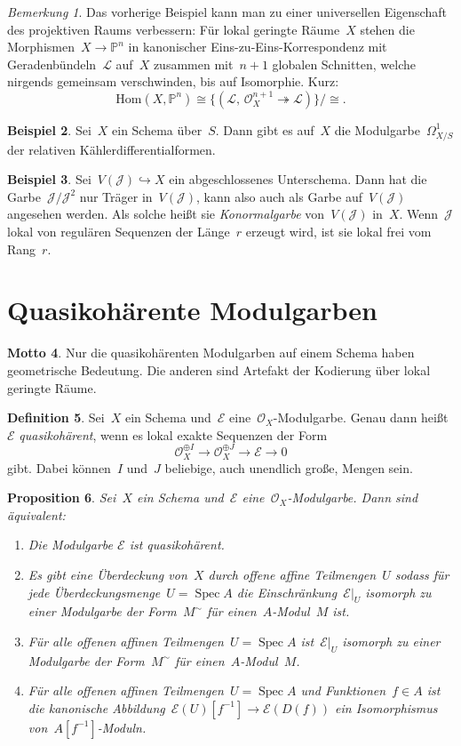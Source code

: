 \documentclass[a4paper,ngerman,12pt]{scrartcl}
\theoremstyle{definition}
\newtheorem{defn}{Definition}[section]
\newtheorem{ex}[defn]{Beispiel}
\newtheorem{motto}[defn]{Motto}
\theoremstyle{plain}
\newtheorem{prop}[defn]{Proposition}
\theoremstyle{remark}
\newtheorem{rem}[defn]{Bemerkung}
\newcommand{\PP}{\mathbb{P}}
\newcommand{\E}{\mathcal{E}}
\newcommand{\J}{\mathcal{J}}
\renewcommand{\L}{\mathcal{L}}
\renewcommand{\O}{\mathcal{O}}
\newcommand{\Hom}{\mathrm{Hom}}
\newcommand{\lra}{\longrightarrow}
\DeclareMathOperator{\Spec}{Spec}
\begin{document}
\begin{rem}Das vorherige Beispiel kann man zu einer universellen Eigenschaft
des projektiven Raums verbessern: Für lokal geringte Räume~$X$ stehen die
Morphismen~$X \to \PP^n$ in kanonischer Eins-zu-Eins-Korrespondenz mit
Geradenbündeln~$\L$ auf~$X$ zusammen mit~$n + 1$ globalen Schnitten, welche
nirgends gemeinsam verschwinden, bis auf Isomorphie. Kurz:
\[ \Hom(X, \PP^n) \cong \{ (\L,\,\O_X^{n+1} \twoheadrightarrow \L) \}/{\cong}. \]
\end{rem}

\begin{ex}Sei~$X$ ein Schema über~$S$. Dann gibt es auf~$X$ die
Modulgarbe~$\Omega^1_{X/S}$ der relativen Kählerdifferentialformen.\end{ex}

\begin{ex}Sei~$V(\J) \hookrightarrow X$ ein abgeschlossenes Unterschema. Dann
hat die Garbe~$\J/\J^2$ nur Träger in~$V(\J)$, kann also auch als Garbe
auf~$V(\J)$ angesehen werden. Als solche heißt sie \emph{Konormalgarbe}
von~$V(\J)$ in~$X$. Wenn~$\J$ lokal von regulären Sequenzen der Länge~$r$
erzeugt wird, ist sie lokal frei vom Rang~$r$.\end{ex}


\section{Quasikohärente Modulgarben}

\begin{motto}Nur die quasikohärenten Modulgarben auf einem Schema haben
geometrische Bedeutung. Die anderen sind Artefakt der Kodierung über lokal
geringte Räume.\end{motto}

\begin{defn}Sei~$X$ ein Schema und~$\E$ eine~$\O_X$-Modulgarbe. Genau dann
heißt~$\E$ \emph{quasikohärent}, wenn es lokal exakte Sequenzen der Form
\[ \O_X^{\oplus I} \lra \O_X^{\oplus J} \lra \E \lra 0 \]
gibt. Dabei können~$I$ und~$J$ beliebige, auch unendlich große, Mengen sein.
\end{defn}

\begin{prop}Sei~$X$ ein Schema und~$\E$ eine~$\O_X$-Modulgarbe. Dann sind
äquivalent:
\begin{enumerate}
\item Die Modulgarbe $\E$ ist quasikohärent.
\item Es gibt eine Überdeckung von~$X$ durch offene affine Teilmengen~$U$ sodass
für jede Überdeckungsmenge~$U = \Spec A$ die Einschränkung~$\E|_U$ isomorph zu
einer Modulgarbe der Form~$M^\sim$ für einen~$A$-Modul~$M$ ist.
\item Für alle offenen affinen Teilmengen~$U = \Spec A$ ist~$\E|_U$ isomorph zu einer
Modulgarbe der Form~$M^\sim$ für einen~$A$-Modul~$M$.
\item Für alle offenen affinen Teilmengen~$U = \Spec A$ und Funktionen~$f \in
A$ ist die kanonische Abbildung~$\E(U)[f^{-1}] \to \E(D(f))$ ein Isomorphismus
von~$A[f^{-1}]$-Moduln.
\end{enumerate}
\end{prop}
\end{document}
